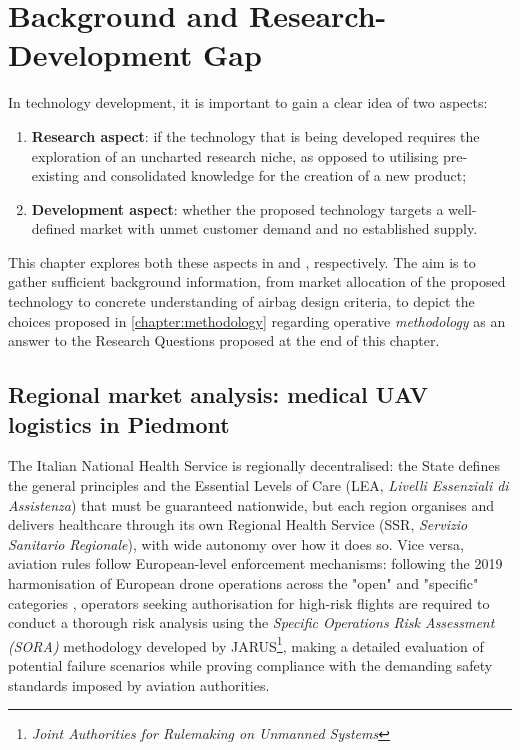 \chapter{Background and Research-Development Gap}
\label{chapter:SoA-and-RnD}

In technology development, it is important to gain a clear idea of two aspects:
\begin{enumerate}
    \item \textbf{Research aspect}: if the technology that is being developed requires the exploration of an uncharted research niche, as opposed to utilising pre-existing and consolidated knowledge for the creation of a new product;
    \item \textbf{Development aspect}: whether the proposed technology targets a well-defined market with unmet customer demand and no established supply.
\end{enumerate} 

This chapter explores both these aspects in  and , respectively. The aim is to gather sufficient background information, from market allocation of the proposed technology to concrete understanding of airbag design criteria, to depict the choices proposed in \cref{chapter:methodology} regarding operative \textit{methodology} as an answer to the Research Questions proposed at the end of this chapter.


\section{Regional market analysis: medical UAV logistics in Piedmont}\label{section:market-analysis}
The Italian National Health Service is regionally decentralised: the State defines the general principles and the Essential Levels of Care (LEA, \textit{Livelli Essenziali di Assistenza}) that must be guaranteed nationwide, but each region organises and delivers healthcare through its own Regional Health Service (SSR, \textit{Servizio Sanitario Regionale}), with wide autonomy over how it does so. Vice versa, aviation rules follow European-level enforcement mechanisms: following the 2019 harmonisation of European drone operations across the "open" and "specific" categories \cite{EU_2019_947}, operators seeking authorisation for high-risk flights are required to conduct a thorough risk analysis using the \textit{Specific Operations Risk Assessment (SORA)} methodology developed by JARUS\footnote{\textit{Joint Authorities for Rulemaking on Unmanned Systems}}, making a detailed evaluation of potential failure scenarios while proving compliance with the demanding safety standards imposed by aviation authorities. 

